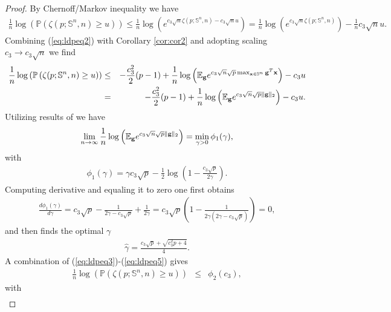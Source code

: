 \documentclass[10pt]{article}
\def\x{{\bf x}}
\def\x{{\mathbf x}}
\def\x{{\bf x}}
\def\x{{\bf x}}
\def\g{{\bf g}}
\def\mE{{\mathbb E}}
\def\mS{{\mathbb S}}
\def\mP{{\mathbb P}}
\def\lp{\left (}
\def\rp{\right )}
\def\x{{\bf x}}
\def\x{{\mathbf x}}
\def\x{{\bf x}}
\def\x{{\bf x}}
\def\g{{\bf g}}
\begin{document}
\begin{proof}
  By Chernoff/Markov inequality we have
 \begin{eqnarray}
 \label{eq:ldpeq2}
\frac{1}{n}\log \lp  \mP \lp \zeta(p;\mS^n,n) \geq u \rp \rp
 \leq  \frac{1}{n} \log \lp e^{c_3 \sqrt{n} \zeta(p;\mS^n,n) -c_3\sqrt{n} u} \rp
 =  \frac{1}{n} \log \lp e^{c_3 \sqrt{n} \zeta(p;\mS^n,n) } \rp -\frac{1}{n}c_3\sqrt{n} u .
  \end{eqnarray}
Combining (\ref{eq:ldpeq2})  with Corollary \ref{cor:cor2} and adopting scaling $c_3\rightarrow c_3\sqrt{n}$ we find
 \begin{eqnarray}
 \label{eq:ldpeq3}
\frac{1}{n}\log \lp  \mP \lp \zeta(p;\mS^n,n) \geq u \rp \rp
& \leq &
 -\frac{c_{3}^2}{2}(p-1)  +  \frac{1}{n}  \log\lp  \mE_{\g} e^{c_{3}\sqrt{n}\sqrt{p}\max_{\x\in\mS^n} \g^T\x } \rp
-c_3 u
\nonumber \\
& = &
  -\frac{c_{3}^2}{2}(p-1)  +  \frac{1}{n}  \log\lp  \mE_{\g} e^{c_{3}\sqrt{n}\sqrt{p} \| \g\|_2} \rp
-c_3 u.
  \end{eqnarray}
Utilizing results of \cite{Stojnicl1RegPosasym,StojnicMoreSophHopBnds10} we have
 \begin{eqnarray}
 \label{eq:ldpeq4}
 \lim_{n\rightarrow \infty} \frac{1}{n}  \log\lp  \mE_{\g} e^{c_{3}\sqrt{n}\sqrt{p} \| \g\|_2} \rp
=
\min_{\gamma > 0 } \phi_1(\gamma),
\end{eqnarray}
with
 \begin{eqnarray}
 \label{eq:ldpeq4a}
\phi_1(\gamma) = \gamma c_3\sqrt{p} -\frac{1}{2} \log\lp 1- \frac{c_3\sqrt{p}}{2\gamma}\rp.
  \end{eqnarray}
  Computing derivative and equaling it to zero one first obtains
 \begin{eqnarray}
 \label{eq:ldpeq4a}
\frac{d\phi_1(\gamma)}{d\gamma} = c_3\sqrt{p} - \frac{1}{ 2\gamma - c_3\sqrt{p}}  + \frac{1}{2\gamma}
=c_3\sqrt{p} \lp 1 - \frac{1}{ 2\gamma (2\gamma - c_3\sqrt{p} ) } \rp = 0,
  \end{eqnarray}
and then finds the optimal $\gamma$
 \begin{eqnarray}
 \label{eq:ldpeq5}
\hat{ \gamma } = \frac{c_3\sqrt{p}  +  \sqrt{c_3^2 p +4} }{4}.
  \end{eqnarray}
A combination of  (\ref{eq:ldpeq3})-(\ref{eq:ldpeq5}) gives
 \begin{eqnarray}
 \label{eq:ldpeq6}
\frac{1}{n}\log \lp  \mP \lp \zeta(p;\mS^n,n) \geq u \rp \rp
& \leq &
\phi_2(c_3),
\end{eqnarray}
with
 \begin{eqnarray}

\end{eqnarray}
\end{proof}
\end{document}
